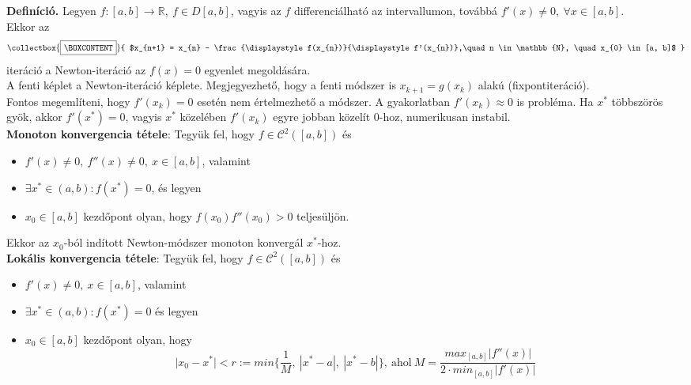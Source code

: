 \documentclass[tikz,12pt,margin=0px]{article}
\newcommand\ddfrac[2]{\frac{\displaystyle #1}{\displaystyle #2}}
\newcommand{\mybox}{%
    \collectbox{%
        \setlength{\fboxsep}{4pt}%
        \fbox{\BOXCONTENT}%
    }%
}
\begin{document}
    \noindent \textbf{Definíció.} Legyen $f: [a, b]\rightarrow \mathbb{R},\ f \in D[a, b]$, vagyis az $f$ differenciálható az intervallumon, továbbá $f'(x) \neq 0,\ \forall x \in [a, b]$. \\

    \noindent Ekkor az
    \[
        \mybox{
        $x_{n+1} = x_{n} - \ddfrac{f(x_{n})}{f'(x_{n})},\quad n \in \mathbb{N}, \quad x_{0} \in [a, b]$
        }
    \]
    iteráció a Newton-iteráció az $f(x) = 0$ egyenlet megoldására.\\
	
	\noindent A fenti képlet a Newton-iteráció képlete. Megjegyezhető, hogy a fenti módszer is $x_{k+1} = g(x_{k})$
	alakú (fixpontiteráció).\\
	
	\noindent Fontos megemlíteni, hogy $f'(x_{k}) = 0$ esetén nem értelmezhető a módszer. A gyakorlatban $f'(x_{k}) \approx 0$ is probléma.
	Ha $x^{*}$ többszörös gyök, akkor $f'(x^{*}) = 0$, vagyis $x^{*}$ közelében $f'(x_{k})$ egyre jobban közelít $0$-hoz, numerikusan
	instabil.\\
	
	\noindent \textbf{Monoton konvergencia tétele}: Tegyük fel, hogy $f \in \mathcal{C}^{2}([a,b])$ és
    \begin{itemize}
        \item $f'(x) \neq 0,\ f''(x) \neq 0,\ x \in [a, b]$, valamint
        \item $\exists x^{*} \in (a,b) : f(x^{*}) = 0$, és legyen
        \item $x_{0} \in [a, b]$ kezdőpont olyan, hogy $f(x_{0})f''(x_{0}) > 0$ teljesüljön.
    \end{itemize}
	
	\noindent Ekkor az $x_{0}$-ból indított Newton-módszer monoton konvergál $x^{*}$-hoz.\\
	
    \noindent \textbf{Lokális konvergencia tétele}:	Tegyük fel, hogy $f \in \mathcal{C}^{2}([a,b])$ és
    \begin{itemize}
        \item $f'(x) \neq 0,\ x \in [a, b]$, valamint
        \item $\exists x^{*} \in (a,b) : f(x^{*}) = 0$ és legyen
        \item $x_{0} \in [a, b]$ kezdőpont olyan, hogy
        \[
            \big|x_{0} - x^{*}\big| < r := min\Big\{\ddfrac{1}{M},\ |x^{*} - a|,\ |x^{*} - b| \Big\},\ \text{ahol}\
            M = \ddfrac{max_{[a, b]}|f''(x)|}{2 \cdot min_{[a,b]}|f'(x)|}
        \]
    \end{itemize}
\end{document}
